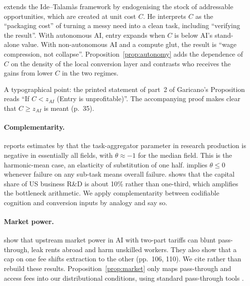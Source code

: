 \documentclass[12pt]{article}
\theoremstyle{remark}
\begin{document}
\citet[pp.~33--35]{garicano2026comment} extends the Ide--Talamàs framework by endogenising the stock of addressable opportunities, which are created at unit cost $C$. He interprets $C$ as the ``packaging cost'' of turning a messy need into a clean task, including ``verifying the result''. With autonomous AI, entry expands when $C$ is below AI's stand-alone value. With non-autonomous AI and a compute glut, the result is ``wage compression, not collapse''. Proposition~\ref{prop:autonomy} adds the dependence of $C$ on the density of the local conversion layer and contrasts who receives the gains from lower $C$ in the two regimes.

A typographical point: the printed statement of part~2 of Garicano's Proposition reads ``If $C<z_{AI}$ (Entry is unprofitable)''. The accompanying proof makes clear that $C\ge z_{AI}$ is meant (p.~35).

\paragraph{Complementarity.} \citet[p.~55]{jones2026rd} reports estimates by \citet{ahmadpoor2019decoding} that the task-aggregator parameter in research production is negative in essentially all fields, with $\theta\approx-1$ for the median field. This is the harmonic-mean case, an elasticity of substitution of one half. \citet{kremer1993oring} implies $\theta\le0$ whenever failure on any sub-task means overall failure. \citet[pp.~63--64]{hall2026comment} shows that the capital share of US business R\&D is about 10\% rather than one-third, which amplifies the bottleneck arithmetic. We apply complementarity between codifiable cognition and conversion inputs by analogy and say so.

\paragraph{Market power.} \citet{athey2026competition} show that upstream market power in AI with two-part tariffs can blunt pass-through, leak rents abroad and harm unskilled workers. They also show that a cap on one fee shifts extraction to the other (pp.~106, 110). We cite rather than rebuild these results. Proposition~\ref{prop:market} only maps pass-through and access fees into our distributional conditions, using standard pass-through tools \citep{weyl2013passthrough}.
\end{document}
